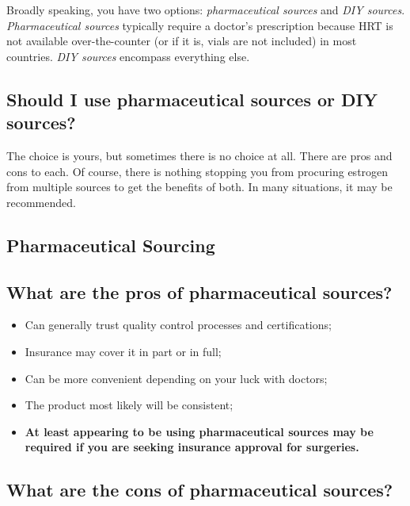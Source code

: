 \documentclass{article}
\begin{document}
{{Broadly speaking, you have two options: \textit{pharmaceutical sources} and \textit{DIY sources}. \textit{Pharmaceutical sources} typically require a doctor's prescription because HRT is not available over-the-counter (or if it is, vials are not included) in most countries. \textit{DIY sources} encompass everything else.

\subsection{Should I use pharmaceutical sources or DIY sources?}

The choice is yours, but sometimes there is no choice at all. There are pros and cons to each. Of course, there is nothing stopping you from procuring estrogen from multiple sources to get the benefits of both. In many situations, it may be recommended.

\subsection*{Pharmaceutical Sourcing}

\subsection{What are the pros of pharmaceutical sources?}

\begin{itemize}
  \item Can generally trust quality control processes and certifications;
  \item Insurance may cover it in part or in full;
  \item Can be more convenient depending on your luck with doctors;
  \item The product most likely will be consistent;
  \item \textbf{At least appearing to be using pharmaceutical sources may be required if you are seeking insurance approval for surgeries.}
\end{itemize}

\subsection{What are the cons of pharmaceutical sources?}

}}
\end{document}
